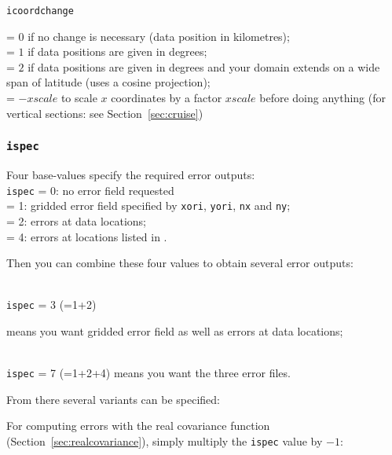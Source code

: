 \texttt{icoordchange} \begin{minipage}[t]{.7\textwidth} = $0$ if no change is necessary (data position in kilometres);\\
                                                        = $1$ if data positions are given in degrees;\\
                                                        = $2$ if data positions are given in degrees and your domain extends on a wide span of latitude                                                           (uses a cosine projection);\\
                                                        = $-xscale$ to scale $x$ coordinates by a factor $xscale$ before doing anything (for vertical sections: see Section~\ref{sec:cruise})
                      \end{minipage}
                      
                      
\subsubsection{\texttt{ispec}}

Four base-values specify the required error outputs:\\

\texttt{ispec}       = 0\qquad: no error field requested\\
  = 1\qquad: gridded error field specified by \texttt{xori}, \texttt{yori}, \texttt{nx} and \texttt{ny}; \\
  = 2\qquad: errors at data locations;\\
  = 4\qquad: errors at locations listed in .

Then you can combine these four values to obtain several error outputs: 

\examples\\
\texttt{ispec}             = 3 (=1+2)\hphantom{+4} \qquad \begin{minipage}[t]{.7\textwidth}means you want gridded error field as well as errors at data locations;\end{minipage}\\ 
\texttt{ispec}             = 7 (=1+2+4) \qquad means you want the three error files.


From there several variants can be specified:

For computing errors with the real covariance function (Section~\ref{sec:realcovariance}), simply multiply the \texttt{ispec} value by $-1$:

